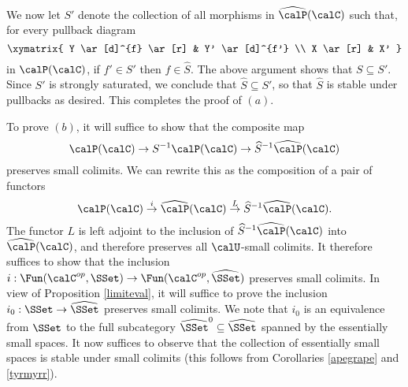 \begin{remark}
We now let $S'$ denote the collection of all morphisms in $\widehat{\calP}(\calC)$ such that, for every pullback diagram
$$ \xymatrix{ Y \ar[d]^{f} \ar[r] & Y' \ar[d]^{f'} \\
X \ar[r] & X' }$$
in $\calP(\calC)$, if $f' \in S'$ then $f \in \widehat{S}$. The above argument shows that
$S \subseteq S'$. Since $S'$ is strongly saturated, we conclude that $\widehat{S} \subseteq S'$, so that $\widehat{S}$ is stable under pullbacks as desired. This completes the proof of $(a)$.

To prove $(b)$, it will suffice to show that the composite map
$$ \calP(\calC) \rightarrow S^{-1} \calP(\calC) \rightarrow \widehat{S}^{-1} \widehat{\calP}(\calC)$$
preserves small colimits. We can rewrite this as the composition of a pair of functors
$$ \calP(\calC) \stackrel{i}{\rightarrow} \widehat{\calP}(\calC)
\stackrel{L}{\rightarrow} \widehat{S}^{-1} \widehat{\calP}(\calC).$$
The functor $L$ is left adjoint to the inclusion of
$\widehat{S}^{-1} \widehat{\calP}(\calC)$ into $\widehat{\calP}(\calC)$, and therefore
preserves all $\calU$-small colimits. It therefore suffices to show that the inclusion
$i: \Fun( \calC^{op}, \SSet) \rightarrow \Fun( \calC^{op}, \widehat{\SSet})$ preserves small colimits.
In view of Proposition \ref{limiteval}, it will suffice to prove the inclusion
$i_0: \SSet \rightarrow \widehat{\SSet}$ preserves small colimits. We note that
$i_0$ is an equivalence from $\SSet$ to the full subcategory
$\widehat{\SSet}^0 \subseteq \widehat{\SSet}$ spanned by the essentially small spaces.
It now suffices to observe that the collection of essentially small spaces is stable under small colimits
(this follows from Corollaries \ref{apegrape} and \ref{tyrmyrr}).
\end{remark}

